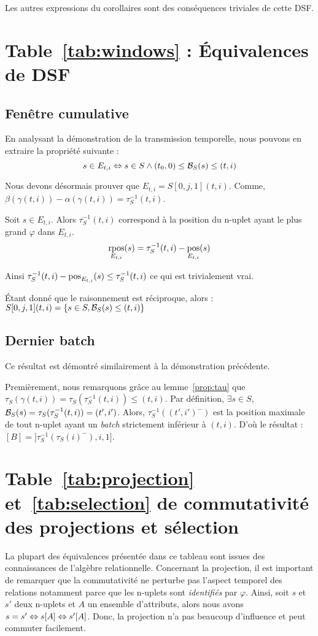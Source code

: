 Les autres expressions du corollaires sont des conséquences triviales de cette DSF.
\findemo

\section{Table~\ref{tab:windows} : Équivalences de DSF}
\subsection{Fenêtre cumulative}
En analysant la démonstration de la transmission temporelle, nous pouvons en extraire la propriété suivante :
$$s\in E_{t,i} \Leftrightarrow s\in S \wedge (t_0,0) \leq \mathcal{B}_S(s) \leq (t,i)$$

Nous devons désormais prouver que $E_{t,i} = S[0,j,1](t,i)$. Comme, $\beta(\gamma(t,i)) - \alpha(\gamma(t,i)) = \tau_S^{-1}(t,i)$.

Soit $s \in E_{t,i}$. Alors $\tau_S^{-1}(t,i)$ correspond à la position du n-uplet ayant le plus grand $\varphi$ dans $E_{t,i}$.
$$\mathop{\mathrm{rpos}}_{E_{t,i}}(s) = \tau_S^{-1}(t,i) - \mathop{\mathrm{pos}}_{E_{t,i}}(s)$$

Ainsi $\tau_S^{-1}(t,i) - \mathop{\mathrm{pos}}_{E_{t,i}}(s) \leq \tau_S^{-1}(t,i)$ ce qui est trivialement vrai.

Étant donné que le raisonnement est réciproque, alors : $S[0,j,1](t,i) = \{s\in S, \mathcal{B}_S(s) \leq (t,i)\}$
\findemo
\subsection{Dernier batch}
Ce résultat est démontré similairement à la démonstration précédente.

Premièrement, nous remarquons grâce au lemme~\ref{prop:tau} que $\tau_S(\gamma(t,i)) = \tau_S(\tau_S^{-1}(t,i)) \leq (t,i)$. Par définition, $\exists s\in S$, $\mathcal{B}_S(s)=\tau_S(\tau_S^{-1}(t,i)) = (t',i')$. Alors, $\tau_S^{-1}((t',i')^-)$ est la position maximale de tout n-uplet ayant un \textit{batch} strictement inférieur à $(t,i)$. D'où le résultat : $[B]=]\tau_S^{-1}(\tau_S(i)^-),i,1]$.
\findemo

\section{Table~\ref{tab:projection} et~\ref{tab:selection} de commutativité des projections et sélection}
La plupart des équivalences présentée dans ce tableau sont issues des connaissances de l'algèbre relationnelle. Concernant la projection, il est important de remarquer que la commutativité ne perturbe pas l'aspect temporel des relations notamment parce que les n-uplets sont \textit{identifiés} par $\varphi$. Ainsi, soit $s$ et $s'$ deux n-uplets et $A$ un ensemble d'attributs, alors nous avons $s = s' \Leftrightarrow s[A] \Leftrightarrow s'[A]$. Donc, la projection n'a pas beaucoup d'influence et peut commuter facilement.

